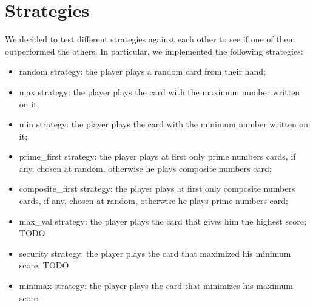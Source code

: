 \section{Strategies} \label{section: Strategies}%
We decided to test different strategies against each other to see if one of them outperformed the others. In particular, we implemented the following strategies:
\begin{itemize}
    \item random strategy: the player plays a random card from their hand;
    \item max strategy: the player plays the card with the maximum number written on it;
    \item min strategy: the player plays the card with the minimum number written on it;
    \item prime\_first strategy: the player plays at first only prime numbers cards, if any, chosen at random, otherwise he plays composite numbers card;
    \item composite\_first strategy: the player plays at first only composite numbers cards, if any, chosen at random, otherwise he plays prime numbers card;
    \item max\_val strategy: the player plays the card that gives him the highest score; TODO
    \item security strategy: the player plays the card that maximized his minimum score; TODO
    \item minimax strategy: the player plays the card that minimizes his maximum score.
\end{itemize}